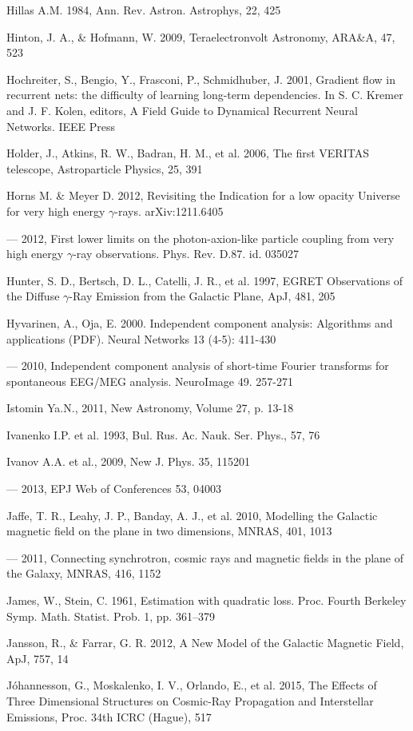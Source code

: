 Hillas A.M. 1984, Ann. Rev. Astron. Astrophys, 22, 425

Hinton, J. A., \& Hofmann, W. 2009, Teraelectronvolt Astronomy, ARA\&A, 47, 523 

Hochreiter, S., Bengio, Y., Frasconi, P., Schmidhuber, J. 2001, Gradient flow in recurrent nets: the difficulty of learning long-term dependencies. In S. C. Kremer and J. F. Kolen, editors, A Field Guide to Dynamical Recurrent Neural Networks. IEEE Press

Holder, J., Atkins, R. W., Badran, H. M., et al. 2006, The first VERITAS telescope, Astroparticle Physics, 25, 391

Horns M. \& Meyer D. 2012, Revisiting the Indication for a low opacity Universe for very high energy $\gamma$-rays. arXiv:1211.6405

--- 2012, First lower limits on the photon-axion-like particle coupling from very high energy $\gamma$-ray observations. Phys. Rev. D.87. id. 035027

Hunter, S. D., Bertsch, D. L., Catelli, J. R., et al. 1997, EGRET Observations of the Diffuse $\gamma$-Ray Emission from the Galactic Plane, ApJ, 481, 205

Hyvarinen, A., Oja, E. 2000. Independent component analysis: Algorithms and applications (PDF). Neural Networks 13 (4-5): 411-430

--- 2010, Independent component analysis of short-time Fourier transforms for spontaneous EEG/MEG analysis. NeuroImage 49. 257-271

Istomin Ya.N., 2011, New Astronomy, Volume 27, p. 13-18 

Ivanenko I.P. et al. 1993, Bul. Rus. Ac. Nauk. Ser. Phys., 57, 76

Ivanov A.A. et al., 2009, New J. Phys. 35, 115201

--- 2013, EPJ Web of Conferences 53, 04003

Jaffe, T. R., Leahy, J. P., Banday, A. J., et al. 2010, Modelling the Galactic magnetic field on the plane in two dimensions, MNRAS, 401, 1013

---  2011, Connecting synchrotron, cosmic rays and magnetic fields in the plane of the Galaxy, MNRAS, 416, 1152

James, W., Stein, C. 1961, Estimation with quadratic loss. Proc. Fourth Berkeley Symp. Math. Statist. Prob. 1, pp. 361--379

Jansson, R., \& Farrar, G. R. 2012, A New Model of the Galactic Magnetic Field, ApJ, 757, 14

J\'ohannesson, G., Moskalenko, I. V., Orlando, E., et al. 2015, The Effects of Three Dimensional Structures on Cosmic-Ray Propagation and Interstellar Emissions, Proc. 34th ICRC (Hague), 517

